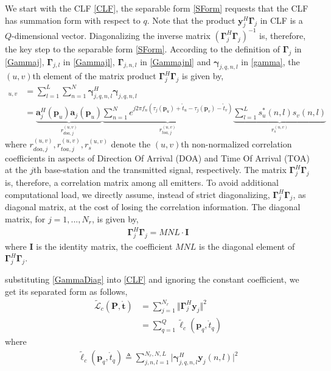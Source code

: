 \documentclass[review]{elsarticle}
\begin{document}
We start with the CLF \eqref{CLF}, the separable form \eqref{SForm} requests that the CLF has summation form with respect to $q$. Note that the product $\boldsymbol{y}_j^H\boldsymbol{\Gamma}_{j}$ in CLF is a $Q$-dimensional vector. Diagonalizing the inverse matrix $(\boldsymbol{\Gamma}_{j}^H\boldsymbol{\Gamma}_{j})^{-1}$ is, therefore, the key step to the separable form \eqref{SForm}. According to the definition of $\boldsymbol{\Gamma}_{j}$ in \eqref{Gammaj},  $\boldsymbol{\Gamma}_{j,l}$ in \eqref{Gammajl}, $\boldsymbol{\Gamma}_{j,n,l}$ in \eqref{Gammajnl} and $\boldsymbol{\gamma}_{j,q,n,l}$ in \eqref{gamma}, the $(u,v)$th element of the matrix product $\boldsymbol{\Gamma}_{j}^H\boldsymbol{\Gamma}_{j}$ is given by,
\begin{align*}
    [\boldsymbol{\Gamma}_{j}^H\boldsymbol{\Gamma}_{j}]_{u,v}&=\sum_{l=1}^L\sum_{n=1}^N \boldsymbol{\gamma}_{j,q,n,l}^H\boldsymbol{\gamma}_{j,q,n,l}\\
    &=\underbrace{\boldsymbol{a}_j^H(\boldsymbol{p}_u)\boldsymbol{a}_j(\boldsymbol{p}_u)}_{r_{doa,j}^{(u,v)}}\underbrace{\sum_{n=1}^N e^{j2\pi f_n(\tau_j(\boldsymbol{p}_u)+\mathring{t}_u-\tau_j(\boldsymbol{p}_v)-\mathring{t}_v)}}_{r_{toa,j}^{(u,v)}}\underbrace{\sum_{l=1}^L s_u^\ast(n,l)s_v(n,l)}_{r_{s}^{(u,v)}}
\end{align*}
where $r_{doa,j}^{(u,v)}, r_{toa,j}^{(u,v)}, r_{s}^{(u,v)}$ denote the $(u,v)$th non-normalized correlation coefficients in aspects of Direction Of Arrival (DOA) and Time Of Arrival (TOA) at the $j$th base-station and the transmitted signal, respectively. The matrix $\boldsymbol{\Gamma}_{j}^H\boldsymbol{\Gamma}_{j}$ is, therefore, a correlation matrix among all emitters. To avoid additional computational load, we directly assume, instead of strict diagonalizing, $\boldsymbol{\Gamma}_{j}^H\boldsymbol{\Gamma}_{j}$, as diagonal matrix, at the cost of losing the correlation information. The diagonal matrix, for $j=1,...,N_r$, is given by,
\begin{align}\label{GammaDiag}
    \boldsymbol{\Gamma}_{j}^H\boldsymbol{\Gamma}_{j}=MNL\cdot \boldsymbol{I}
\end{align}
where $\boldsymbol{I}$ is the identity matrix, the coefficient $MNL$ is the diagonal element of $\boldsymbol{\Gamma}_{j}^H\boldsymbol{\Gamma}_{j}$. 

substituting \eqref{GammaDiag} into \eqref{CLF} and ignoring the constant coefficient, we get its separated form as follows,
\begin{align}\label{GLc}
    \tilde{\mathcal{L}}_c(\boldsymbol{P},\mathring{\boldsymbol{t}})&= \sum_{j=1}^{N_r}\Vert \boldsymbol{\Gamma}_{j}^H\boldsymbol{y}_j\Vert ^2\\
    &=\sum_{q=1}^Q \tilde{\ell}_c(\boldsymbol{p}_q,\mathring{t}_q)
\end{align}
where 
\begin{align}\label{glc}
    \tilde{\ell}_c(\boldsymbol{p}_q,\mathring{t}_q)\triangleq \sum_{j,n,l=1}^{N_r,N,L} \vert \boldsymbol{\gamma}_{j,q,n,l}^H\boldsymbol{y}_j(n,l)\vert ^2
\end{align}
\end{document}
